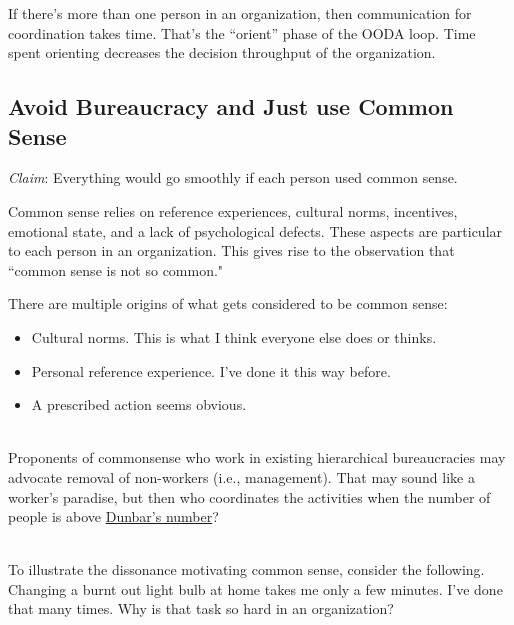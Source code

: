 

If there's more than one person in an organization, then communication for coordination takes time. That's the ``orient'' phase of the OODA loop. Time spent orienting decreases the decision throughput of the organization.



\subsection*{Avoid Bureaucracy and Just use Common Sense}
\textit{Claim}: Everything would go smoothly if each person used common sense.

Common sense relies on reference experiences, cultural norms, incentives, emotional state, and a lack of psychological defects. These aspects are particular to each person in an organization. This gives rise to the observation that 
``common sense is not so common." 

There are multiple origins of what gets considered to be common sense:
\begin{itemize}
\item Cultural norms. This is what I think everyone else does or thinks.
\item Personal \gls{reference experience}. I've done it this way before.
\item A prescribed action seems obvious.
\end{itemize}

\ \\

Proponents of commonsense who work in existing hierarchical bureaucracies may advocate removal of non-workers (i.e., management). That may sound like a worker's paradise, but then who coordinates the activities when the number of people is above 
\href{https://en.wikipedia.org/wiki/Dunbar\%27s_number}{Dunbar's number}?

\ \\

To illustrate the dissonance motivating common sense, consider the following. 
Changing a burnt out light bulb at home takes me only a few minutes. I've done that many times. Why is that task so hard in an organization?

